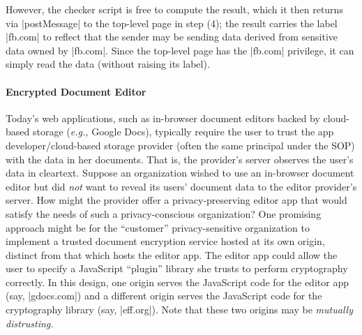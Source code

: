 %
However, the checker script is free to compute the result, which
it then returns via \js|postMessage| to the top-level page in step (4); the
result carries the label \js|fb.com| to reflect that the sender may be
sending data derived from sensitive data owned by \js|fb.com|.
%
Since the top-level page has the \js|fb.com| privilege, it can simply
read the data (without raising its label).

\paragraph{Encrypted Document Editor}
Today's web applications, such as in-browser document editors backed
by cloud-based storage (\emph{e.g.,} Google Docs), typically require the user
to trust the app developer/cloud-based storage provider (often the
same principal under the SOP) with the data in her documents. That is,
the provider's server observes the user's data in cleartext. Suppose
an organization wished to use an in-browser document editor but did
{\em not} want to reveal its users' document data to the editor
provider's server. How might the provider offer a privacy-preserving
editor app that would satisfy the needs of such a privacy-conscious
organization?  One promising approach might be for the ``customer''
privacy-sensitive organization to implement a trusted document encryption
service hosted at its own origin, distinct from that which hosts the
editor app. The editor app could allow the user to specify a JavaScript
``plugin'' library she trusts to perform cryptography correctly. In this design,
one origin serves the JavaScript code for the editor app (say,
\js|gdocs.com|) and a different origin serves the JavaScript code for
the cryptography library (say, \js|eff.org|). Note that these two
origins may be {\em mutually distrusting.}
